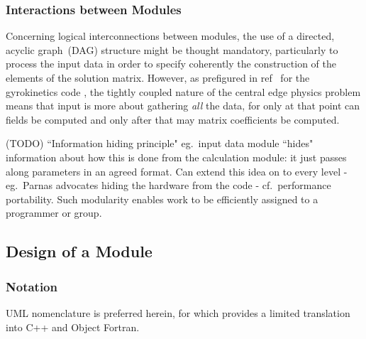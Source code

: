 \subsubsection{Interactions between Modules}\label{sec:TS_modulint}
Concerning logical interconnections between modules, the 
use of  a directed, acyclic graph~(DAG) structure might be thought mandatory,
particularly to  process the input
data in order to specify coherently the construction of the elements of the solution matrix.
However, as prefigured in ref~\cite{y2re333} for the gyrokinetics code ,
the tightly coupled nature of the central edge
physics problem  means that input is more about gathering \emph{all} the data, for only at that point
can fields be computed and only after that may matrix coefficients be computed.

(TODO) ``Information hiding principle" eg.\ input data module ``hides" information about how this is done from
the calculation module: it just passes along parameters in an agreed format.
Can extend this idea on to every level - eg.\ Parnas advocates hiding the hardware from the code -
cf.\  performance portability.
Such modularity  enables work to be efficiently  assigned to a programmer or group.

\subsection{Design of a Module}\label{sec:TS_lowlevel}
\subsubsection{Notation}

UML nomenclature is preferred herein, for which  provides a limited 
translation into C++ and Object Fortran. %

